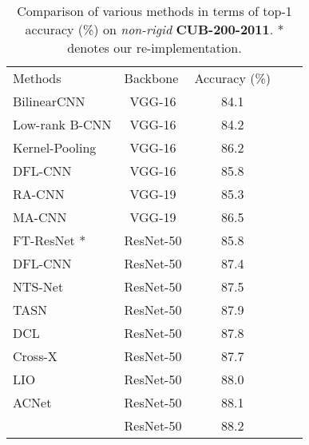 \documentclass[journal]{IEEEtran}
\begin{document}
\begin{table}[t]
\caption{Comparison of various methods in terms of top-1 accuracy (\%) on \emph{non-rigid} \textbf{CUB-200-2011}. * denotes our re-implementation.}
\small
\begin{center}
\begin{tabular}{|l|c|c|c|c|}
\hline
\multicolumn{1}{|l|}{\multirow{2}{*}{Methods}}& \multicolumn{1}{l|}{\multirow{2}{*}{Backbone}}& \multicolumn{1}{l|}{\multirow{2}{*}{Accuracy (\%)}}\\
\multicolumn{1}{|c|}{} & {}  &\\
\hline\hline
BilinearCNN \cite{LinRM18} & VGG-16  &84.1\\
Low-rank B-CNN \cite{kong2017low}& VGG-16 &84.2\\
Kernel-Pooling \cite{cui2017kernel}&VGG-16 &86.2 \\
DFL-CNN \cite{wang2018learning}&VGG-16 &85.8\\
\hline
RA-CNN \cite{fu2017look} & VGG-19 &85.3\\
MA-CNN \cite{zheng2017learning}& VGG-19 &86.5 \\
\hline
FT-ResNet \cite{he2016deep}* & ResNet-50  &85.8 \\
DFL-CNN \cite{wang2018learning}& ResNet-50 &87.4\\
NTS-Net \cite{yang2018learning} & ResNet-50  &87.5\\
TASN \cite{zheng2019looking} &ResNet-50 &{87.9} \\
DCL \cite{Chen_2019_CVPR} & ResNet-50 &87.8 \\
Cross-X \cite{luo2019cross} & ResNet-50  &87.7\\
LIO \cite{Zhou_2020_CVPR} & ResNet-50 &88.0\\
ACNet \cite{ji2020attention} & ResNet-50  &88.1\\
\hline
 \rowcolor{mygray} \rowcolor{mygray}{CMN (ours)} & ResNet-50 & 88.2\\
\hline
\end{tabular}
\end{center}
\label{tab4}
\end{table}
\end{document}
